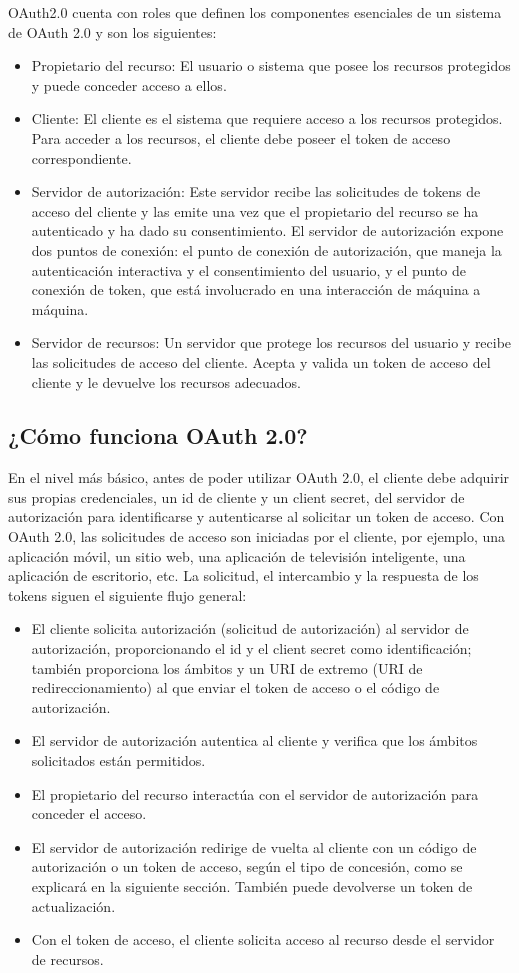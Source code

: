 \documentclass[12pt]{article}
\begin{document}
OAuth2.0 cuenta con roles que definen los componentes esenciales de un sistema de OAuth 2.0 y son los siguientes:
\begin{itemize}
\item Propietario del recurso: El usuario o sistema que posee los recursos protegidos y puede conceder acceso a ellos.
\item Cliente: El cliente es el sistema que requiere acceso a los recursos protegidos. Para acceder a los recursos, el cliente debe poseer el token de acceso correspondiente.
\item Servidor de autorización: Este servidor recibe las solicitudes de tokens de acceso del cliente y las emite una vez que el propietario del recurso se ha autenticado y ha dado su consentimiento. El servidor de autorización expone dos puntos de conexión: el punto de conexión de autorización, que maneja la autenticación interactiva y el consentimiento del usuario, y el punto de conexión de token, que está involucrado en una interacción de máquina a máquina.
\item Servidor de recursos: Un servidor que protege los recursos del usuario y recibe las solicitudes de acceso del cliente. Acepta y valida un token de acceso del cliente y le devuelve los recursos adecuados.
\end{itemize}

\subsection*{¿Cómo funciona OAuth 2.0?}

En el nivel más básico, antes de poder utilizar OAuth 2.0, el cliente debe adquirir sus propias credenciales, un id de cliente y un client secret, del servidor de autorización para identificarse y autenticarse al solicitar un token de acceso.
Con OAuth 2.0, las solicitudes de acceso son iniciadas por el cliente, por ejemplo, una aplicación móvil, un sitio web, una aplicación de televisión inteligente, una aplicación de escritorio, etc. La solicitud, el intercambio y la respuesta de los tokens siguen el siguiente flujo general:
\begin{itemize}
\item El cliente solicita autorización (solicitud de autorización) al servidor de autorización, proporcionando el id y el client secret como identificación; también proporciona los ámbitos y un URI de extremo (URI de redireccionamiento) al que enviar el token de acceso o el código de autorización.
\item El servidor de autorización autentica al cliente y verifica que los ámbitos solicitados están permitidos.
\item El propietario del recurso interactúa con el servidor de autorización para conceder el acceso.
\item El servidor de autorización redirige de vuelta al cliente con un código de autorización o un token de acceso, según el tipo de concesión, como se explicará en la siguiente sección. También puede devolverse un token de actualización.
\item Con el token de acceso, el cliente solicita acceso al recurso desde el servidor de recursos.
\end{itemize}
\end{document}
